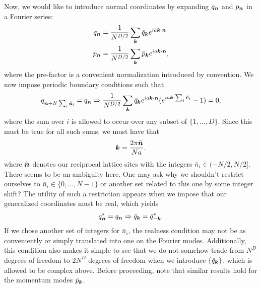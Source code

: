 {Now, we would like to introduce normal coordinates by expanding $q_{\vb*{n}}$ and $p_{\vb*{n}}$ in a Fourier series:
\begin{align}
    q_{\vb*{n}} &= \frac{1}{N^{D/2}} \sum_{\vb*{k}} \bar{q}_{\vb*{k}} e^{i a \vb*{k} \cdot \vb*{n}} \\
    p_{\vb*{n}} &= \frac{1}{N^{D/2}} \sum_{\vb*{k}} \bar{p}_{\vb*{k}} e^{i a \vb*{k} \cdot \vb*{n}}
,\end{align}
where the pre-factor is a convenient normalization introduced by convention.
We now impose periodic boundary conditions such that
\begin{align}
    q_{\vb*{n} + N \sum_{i} \vu*{e}_{i}} = q_{\vb*{n}} \Rightarrow \frac{1}{N^{D/2}} \sum_{\vb*{k}} \bar{q}_{\vb*{k}} e^{ia \vb*{k} \cdot \vb*{n}} ( e^{i a \vb*{k} \cdot \sum_{i} \vu*{e}_{i}} - 1) = 0
,\end{align}
where the sum over $i$ is allowed to occur over any subset of $\{1,\ldots,D\}$.
Since this must be true for all such sums, we must have that
\begin{align}
    \vb*{k} = \frac{2 \pi \bar{\vb*{n}}}{N a}
.\end{align}
where $\bar{\vb*{n}}$ denotes our reciprocal lattice sites with the integers $\bar{n}_{i} \in (-N/2,N/2]$.
There seems to be an ambiguity here. 
One may ask why we shouldn't restrict ourselves to $\bar{n}_{i} \in \{ 0,\ldots,N-1 \}$ or another set related to this one by some integer shift?
The utility of such a restriction appears when we impose that our generalized coordinates must be real, which yields
\begin{align}
    q_{\vb*{n}}^{*} = q_{\vb*{n}} \Rightarrow \bar{q}_{\vb*{k}} = \bar{q}_{-\vb*{k}}^{*}
.\end{align}
If we chose another set of integers for $\bar{n}_{i}$, the realness condition may not be as conveniently or simply translated into one on the Fourier modes.
Additionally, this condition also makes it simple to see that we do not somehow trade from $N^{D}$ degrees of freedom to $2 N^{D}$ degrees of freedom when we introduce $\{ \bar{q}_{\vb*{k}} \}$, which is allowed to be complex above.
Before proceeding, note that similar results hold for the momentum modes $\bar{p}_{\vb*{k}}$.

}
